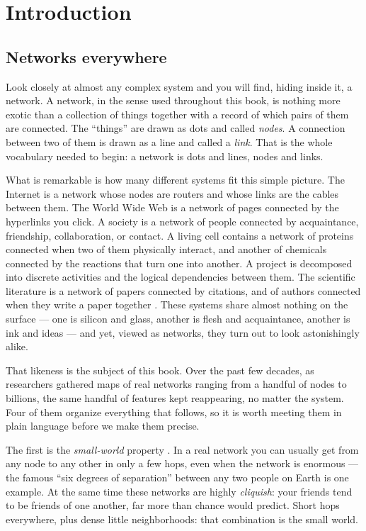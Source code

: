 \chapter{Introduction}
\label{ch:introduction}

\setcounter{page}{1}

\section{Networks everywhere}

Look closely at almost any complex system and you will find, hiding inside 
it, a network. A network, in the sense used throughout this book, is nothing 
more exotic than a collection of things together with a record of which pairs 
of them are connected. The ``things'' are drawn as dots and called 
\emph{nodes}. A connection between two of them is drawn as a line and called 
a \emph{link}. That is the whole vocabulary needed to begin: a network is 
dots and lines, nodes and links.

What is remarkable is how many different systems fit this simple picture. The 
Internet is a network whose nodes are routers and whose links are the cables 
between them. The World Wide Web is a network of pages connected by the 
hyperlinks you click. A society is a network of people connected by 
acquaintance, friendship, collaboration, or contact. A living cell contains a 
network of proteins connected when two of them physically interact, and 
another of chemicals connected by the reactions that turn one into another. A 
project is decomposed into discrete activities and the logical dependencies 
between them. The scientific literature is a network of papers connected by 
citations, and of authors connected when they write a paper together 
\citep{newman2001,newman2003,albert2002,dorogovtsev2002}. These systems share 
almost nothing on the surface --- one is silicon and glass, another is flesh 
and acquaintance, another is ink and ideas --- and yet, viewed as networks, 
they turn out to look astonishingly alike.

That likeness is the subject of this book. Over the past few decades, as
researchers gathered maps of real networks ranging from a handful of nodes to
billions, the same handful of features kept reappearing, no matter the system.
Four of them organize everything that follows, so it is worth meeting them in
plain language before we make them precise.

The first is the \emph{small-world} property \citep{watts1998}. In a real
network you can usually get from any node to any other in only a few hops, even
when the network is enormous --- the famous ``six degrees of separation'' between
any two people on Earth is one example. At the same time these networks are
highly \emph{cliquish}: your friends tend to be friends of one another, far more
than chance would predict. Short hops everywhere, plus dense little
neighborhoods: that combination is the small world.

